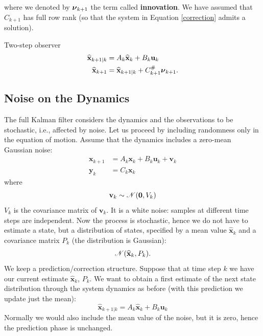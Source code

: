 \documentclass[10pt, a4paper]{report}
\begin{document}
where we denoted by ${\boldsymbol{\nu}}_{k+1}$ the term called \textbf{innovation}. We have assumed that $C_{k+1}$ has full row rank (so that the system in Equation \eqref{correction} admits a solution). 
\begin{boxdefinition}{Two-step observer}{}
    \begin{align}
    \widehat{\mathbf x}_{k+1|k}&=A_k\widehat{\mathbf x}_k+B_k\mathbf u_k\\
    \widehat{\mathbf x}_{k+1}&=\widehat{\mathbf x}_{k+1|k}+
    C_{k+1}^\#{\boldsymbol{\nu}}_{k+1}.
\end{align}
\end{boxdefinition}
\subsection{Noise on the Dynamics}
The full Kalman filter considers the dynamics and the observations to be stochastic, i.e., affected by noise. Let us proceed by including randomness only in the equation of motion.
Assume that the dynamics includes a zero-mean Gaussian noise:
\begin{align}
    \mathbf x_{k+1}&=A_k\mathbf x_k+B_k\mathbf u_k+\mathbf v_k\label{motion_KF_noise}\\ 
    \mathbf y_k&=C_k\mathbf x_k
\end{align}
where\begin{equation}
    \mathbf v_k\sim \mathscr{N}(\mathbf 0,V_k)
\end{equation}
$V_k$ is the covariance matrix of $\mathbf v_k$. It is a white noise: samples at different time steps are independent. Now the process is stochastic, hence we do not have to estimate a state, but a distribution of states, specified by a mean value $\widehat{\mathbf x}_k$ and a covariance matrix $P_k$ (the distribution is Gaussian):\begin{equation}
    \mathscr{N}(\widehat{\mathbf x}_k,P_k).
\end{equation} 
We keep a prediction/correction structure.
Suppose that at time step $k$ we have our current estimate $\widehat{\mathbf x}_k$, $P_k$. We want to obtain a first estimate of the next state distribution through the system dynamics as before (with this prediction we update just the mean):
\begin{equation}\label{pred_noise}
    \widehat{\mathbf x}_{k+1|k}=A_k\widehat{\mathbf x}_k+B_k\mathbf u_k
\end{equation}
Normally we would also include the mean value of the noise, but it is zero, hence the prediction phase is unchanged.
\end{document}
